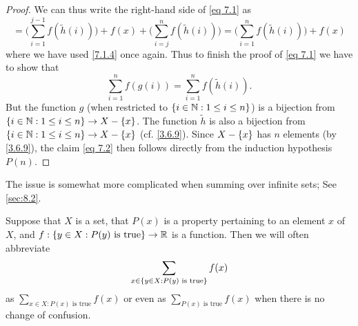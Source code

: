 \begin{proof}
  We can thus write the right-hand side of \eqref{eq 7.1} as
  \[
    = \Bigg(\sum_{i = 1}^{j - 1} f(\tilde{h}(i))\Bigg) + f(x) + \Bigg(\sum_{i = j}^n f(\tilde{h}(i))\Bigg) = \Bigg(\sum_{i = 1}^n f(\tilde{h}(i))\Bigg) + f(x)
  \]
  where we have used \cref{7.1.4} once again.
  Thus to finish the proof of \eqref{eq 7.1} we have to show that
  \[
    \sum_{i = 1}^n f(g(i)) = \sum_{i = 1}^n f(\tilde{h}(i)). \tag{7.2}\label{eq 7.2}
  \]
  But the function \(g\) (when restricted to \(\left\lbrace i \in \mathbb{N} : 1 \leq i \leq n\right\rbrace\)) is a bijection from \(\left\lbrace i \in \mathbb{N} : 1 \leq i \leq n\right\rbrace \to X - \left\lbrace x\right\rbrace\).
  The function \(\tilde{h}\) is also a bijection from \(\left\lbrace i \in \mathbb{N} : 1 \leq i \leq n\right\rbrace \to X - \left\lbrace x\right\rbrace\) (cf. \cref{3.6.9}).
  Since \(X - \left\lbrace x\right\rbrace\) has \(n\) elements (by \cref{3.6.9}), the claim \eqref{eq 7.2} then follows directly from the induction hypothesis \(P(n)\).
\end{proof}

\begin{rmk}\label{7.1.9}
  The issue is somewhat more complicated when summing over infinite sets;
  See \cref{sec:8.2}.
\end{rmk}

\begin{rmk}\label{7.1.10}
  Suppose that \(X\) is a set, that \(P(x)\) is a property pertaining to an element \(x\) of \(X\), and \(f : \left\lbrace y \in X : P(y) \text{ is true}\right\rbrace \to \mathbb{R}\) is a function.
  Then we will often abbreviate
  \[
    \sum_{x \in \left\lbrace y \in X : P(y) \text{ is true}\right\rbrace} f(x)
  \]
  as \(\sum_{x \in X : P(x) \text{ is true}} f(x)\) or even as \(\sum_{P(x) \text{ is true}} f(x)\) when there is no change of confusion.
\end{rmk}

